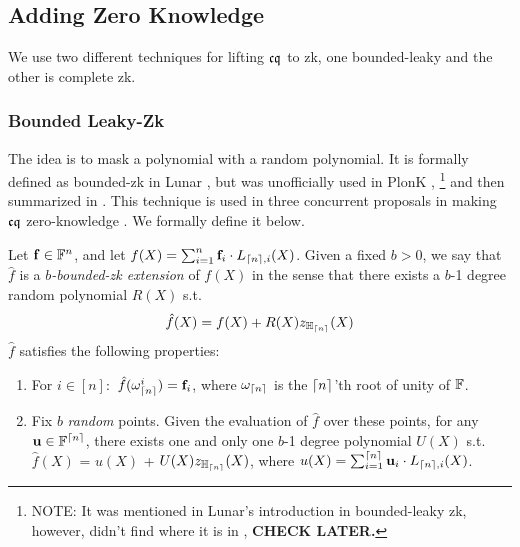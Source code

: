 
\subsection{Adding Zero Knowledge}
We use two different techniques for lifting ${\mathfrak{cq}}$ to zk, one bounded-leaky
and the other is complete zk.

\subsubsection{Bounded Leaky-Zk}
The idea is to mask a polynomial with a random polynomial.
It is formally defined as bounded-zk in Lunar \cite{Lunar},
but was unofficially used in PlonK \cite{GWC19},
\footnote{ 
NOTE: It was mentioned in Lunar's
introduction in bounded-leaky zk, 
however, didn't find where it is in \cite{GWC19}, {\bf CHECK LATER.}}
and then summarized in \cite[Section 3.6]{CCG23}.
This technique is used in three concurrent proposals in
making ${\mathfrak{cq}}$ zero-knowledge \cite{CCG23,FullIZPR,MatrixLookup}.
We formally define it below.

\begin{lemma} Let ${{\mathbf {f}}} \in \mathbb{F}^n$, and let 
$f(X) = \sum_{i=1}^n {{\mathbf {f}}}_i \cdot L_{{\lceil{n}\rceil},i}(X)$.
Given a fixed $b>0$, we say that $\hat{f}$
is a {\em $b$-bounded-zk extension} of $f(X)$ 
in the sense that there exists a $b$-1 degree
random polynomial $R(X)$ s.t.
\[
	\hat{f}(X) = f(X) + R(X) z_{{\mathbb{H}_{{\lceil{n}\rceil}}}}(X)
\]
$\hat{f}$ satisfies the following properties:
\begin{enumerate}
	\item For $i\in [n]:$ $\hat{f}(\omega_{{\lceil{n}\rceil}}^i) = {{\mathbf {f}}}_i$, where
	$\omega_{{\lceil{n}\rceil}}$ is the ${\lceil{n}\rceil}$'th root of unity of $\mathbb{F}$.
	\item Fix $b$ {\em random} points. Given the evaluation of $\hat{f}$ 
		over these points,
		for any ${{\mathbf {u}}} \in \mathbb{F}^{{\lceil{n}\rceil}}$,
		there exists one and only one $b$-1 degree polynomial $U(X)$ s.t.
		$\hat{f}(X)$ = $u(X)$ + $U(X) z_{{\mathbb{H}_{{\lceil{n}\rceil}}}}(X)$, 
		where $u(X) = \sum_{i=1}^{{\lceil{n}\rceil}} {{\mathbf {u}}}_i \cdot L_{{\lceil{n}\rceil},i}(X)$.
\end{enumerate}
\end{lemma}

